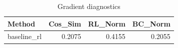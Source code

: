 \begin{table}[htbp]
\centering
\caption{Gradient diagnostics}
\label{tab:grad-diag}
\begin{tabular}{lrrr}
\toprule
\textbf{Method} & \textbf{Cos\_Sim} & \textbf{RL\_Norm} & \textbf{BC\_Norm} \\
\midrule
baseline\_rl & 0.2075 & 0.4155 & 0.2055 \\
\bottomrule
\end{tabular}
\end{table}